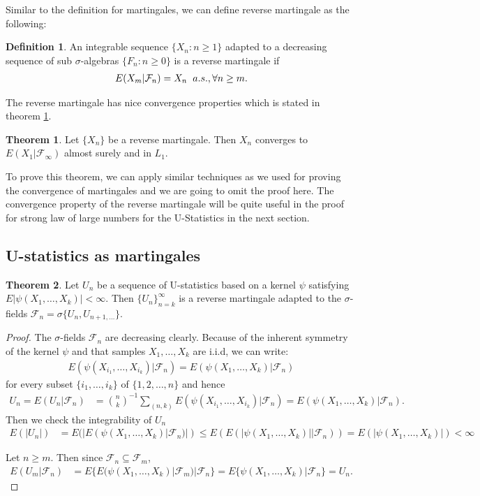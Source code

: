 \documentclass{article}
\theoremstyle{definition}
\newtheorem{theorem}{Theorem}
\newtheorem{Def}{Definition}
\numberwithin{Def}{section}
\begin{document}
Similar to the definition for martingales, we can define reverse martingale as the following:
\begin{Def}
An integrable sequence $\{X_n: n\ge 1\}$ adapted to a decreasing sequence of sub $\sigma$-algebras $\{F_n: n\ge 0\}$ is a reverse martingale if
\begin{align*}
 E(X_m|\mathcal{F}_n)=X_n \hspace{0.2cm} a.s., \forall n\ge m.
\end{align*}
\end{Def}

The reverse martingale has nice convergence properties which is stated in theorem \ref{conv_rm}.
\begin{theorem}\label{conv_rm}
Let $\{X_n\}$ be a reverse martingale. Then $X_n$ converges to $E(X_1|\mathcal{F}_{\infty})$ almost surely and in $L_1$. 
\end{theorem}
To prove this theorem, we can apply similar techniques as we used for proving the convergence of martingales and we are going to omit the proof here. The convergence property of the reverse martingale will be quite useful in the proof for strong law of large numbers for the U-Statistics in the next section.

\subsection{U-statistics as martingales}
\begin{theorem}
Let $U_n$ be a sequence of U-statistics based on a kernel $\psi$ satisfying $E|\psi(X_1, \dotsc, X_k)|<\infty$. Then $\{U_n\}_{n=k}^\infty$ is a reverse martingale adapted to the $\sigma$-fields $\mathcal{F}_n=\sigma\{U_n, U_{n+1,\dotsc}\}$.
\end{theorem}

\begin{proof}
The $\sigma$-fields $\mathcal{F}_n$ are decreasing clearly. Because of the inherent symmetry of the kernel $\psi$ and that samples $X_1, \dotsc, X_k$ are i.i.d, we can write:
\begin{align*}
    E(\psi (X_{i_1}, \dotsc, X_{i_k})|\mathcal{F}_n)=E(\psi (X_1, \dotsc, X_k)|\mathcal{F}_n)
\end{align*}
for every subset $\{i_1, \dotsc, i_k\}$ of $\{1,2,\dotsc,n\}$ and hence 
\begin{align*}
    U_n=E(U_n|\mathcal{F}_n)&={n\choose k}^{-1}\sum_{(n,k)}E(\psi(X_{i_1}, \dotsc,X_{i_k})|\mathcal{F}_n)
    =E(\psi(X_1,\dotsc,X_k)|\mathcal{F}_n).
\end{align*}
Then we check the integrability of $U_n$
\begin{align*}
E(|U_n|)&=E(|E(\psi(X_1,\dotsc,X_k)|\mathcal{F}_n)|)\le E(E(|\psi(X_1,\dotsc,X_k)||\mathcal{F}_n))
=E(|\psi(X_1,\dotsc, X_k)|)<\infty
\end{align*}

Let $n\ge m$. Then since $\mathcal{F}_n \subseteq \mathcal{F}_m$,
\begin{align*}
    E(U_m|\mathcal{F}_n)&=E\{E(\psi(X_1,\dotsc,X_k)|\mathcal{F}_m)|\mathcal{F}_n\}
    =E\{\psi(X_1,\dotsc,X_k)|\mathcal{F}_n\}
    =U_n.
\end{align*}
\end{proof}
\end{document}
